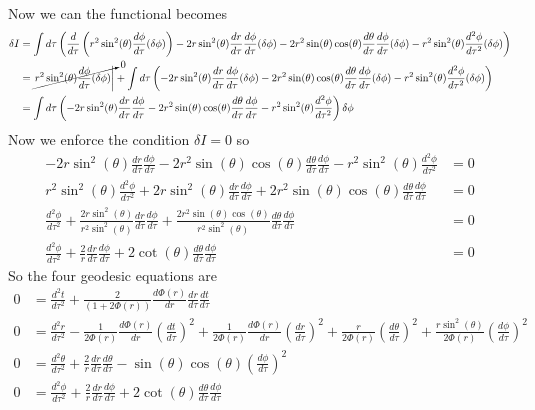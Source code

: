\documentclass[11pt]{article}
\numberwithin{equation}{section}
\begin{document}
\begin{enumerate}[(a)]
\begin{align*}
\end{align*}
Now we can the functional becomes
\begin{align*}
\delta I &= \int d\tau\left(\frac{d}{d\tau}\left(r^2\sin^2(\theta)\frac{d\phi}{d\tau}(\delta\phi)\right) - 2r\sin^2(\theta)\frac{dr}{d\tau}\frac{d\phi}{d\tau}(\delta\phi) - 2r^2\sin(\theta)\cos(\theta)\frac{d\theta}{d\tau}\frac{d\phi}{d\tau}(\delta\phi)-r^2\sin^2(\theta)\frac{d^2\phi}{d\tau^2}(\delta\phi) \right)\\
&= \cancelto{0}{\left.r^2\sin^2(\theta)\frac{d\phi}{d\tau}(\delta\phi)\right|} + \int d\tau\left( - 2r\sin^2(\theta)\frac{dr}{d\tau}\frac{d\phi}{d\tau}(\delta\phi) - 2r^2\sin(\theta)\cos(\theta)\frac{d\theta}{d\tau}\frac{d\phi}{d\tau}(\delta\phi)-r^2\sin^2(\theta)\frac{d^2\phi}{d\tau^2}(\delta\phi) \right)\\
&=  \int d\tau\left(-2r\sin^2(\theta)\frac{dr}{d\tau}\frac{d\phi}{d\tau} - 2r^2\sin(\theta)\cos(\theta)\frac{d\theta}{d\tau}\frac{d\phi}{d\tau}-r^2\sin^2(\theta)\frac{d^2\phi}{d\tau^2} \right)\delta\phi
\end{align*}
Now we enforce the condition $\delta I = 0$ so
\begin{align*}
-2r\sin^2(\theta)\frac{dr}{d\tau}\frac{d\phi}{d\tau} - 2r^2\sin(\theta)\cos(\theta)\frac{d\theta}{d\tau}\frac{d\phi}{d\tau}-r^2\sin^2(\theta)\frac{d^2\phi}{d\tau^2} &= 0\\
r^2\sin^2(\theta)\frac{d^2\phi}{d\tau^2} + 2r\sin^2(\theta)\frac{dr}{d\tau}\frac{d\phi}{d\tau} + 2r^2\sin(\theta)\cos(\theta)\frac{d\theta}{d\tau}\frac{d\phi}{d\tau}   &= 0\\
\frac{d^2\phi}{d\tau^2} + \frac{2r\sin^2(\theta)}{r^2\sin^2(\theta)}\frac{dr}{d\tau}\frac{d\phi}{d\tau} + \frac{2r^2\sin(\theta)\cos(\theta)}{r^2\sin^2(\theta)}\frac{d\theta}{d\tau}\frac{d\phi}{d\tau}   &= 0\\
\frac{d^2\phi}{d\tau^2} + \frac{2}{r}\frac{dr}{d\tau}\frac{d\phi}{d\tau} + 2\cot(\theta)\frac{d\theta}{d\tau}\frac{d\phi}{d\tau}   &= 0
\end{align*}
So the four geodesic equations are
\begin{align}
\label{GeoD1}
0 &= \frac{d^2t}{d\tau^2} + \frac{2}{(1+2\Phi(r))}\frac{d\Phi(r)}{dr}\frac{dr}{d\tau}\frac{dt}{d\tau}  \\
\label{GeoD2}
0 &= \frac{d^2r}{d\tau^2} - \frac{1}{2\Phi(r)}\frac{d\Phi(r)}{dr}\left(\frac{dt}{d\tau}\right)^2 +\frac{1}{2\Phi(r)} \frac{d\Phi(r)}{dr}\left(\frac{dr}{d\tau}\right)^2  +\frac{r}{2\Phi(r)} \left(\frac{d\theta}{d\tau}\right)^2 + \frac{r\sin^2(\theta)}{2\Phi(r)}\left(\frac{d\phi}{d\tau}\right)^2 \\
\label{GeoD3}
0 &= \frac{d^2\theta}{d\tau^2} + \frac{2}{r}\frac{dr}{d\tau}\frac{d\theta}{d\tau}   - \sin(\theta)\cos(\theta)\left(\frac{d\phi}{d\tau}\right)^2 \\
\label{GeoD4}
0 &= \frac{d^2\phi}{d\tau^2} + \frac{2}{r}\frac{dr}{d\tau}\frac{d\phi}{d\tau} + 2\cot(\theta)\frac{d\theta}{d\tau}\frac{d\phi}{d\tau}   
\end{align}


\end{enumerate}
\end{document}
